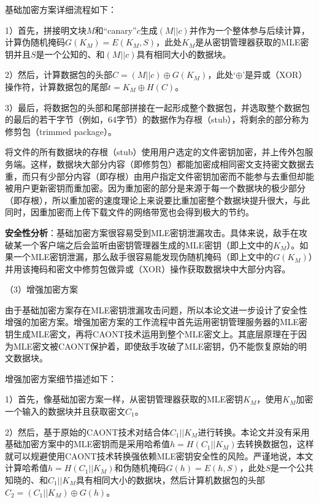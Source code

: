 \documentclass[promaster]{thesis-uestc}
\begin{document}
基础加密方案详细流程如下：

1）首先，拼接明文块$M$和“canary”$c$生成$(M||c)$并作为一个整体参与后续计算，计算伪随机掩码$G(K_M) = E(K_M, S)$，此处$K_M$是从密钥管理器获取的MLE密钥并且$S$是一个公知的、和$(M||c)$具有相同大小的数据块。

2）然后，计算数据包的头部$C = (M||c) \oplus G(K_M)$，此处‘$\oplus$’是异或（XOR）操作符，计算数据包的尾部$t = K_M \oplus H(C)$。

3）最后，将数据包的头部和尾部拼接在一起形成整个数据包，并选取整个数据包的最后的若干字节（例如，64字节）的数据作为存根（stub），将剩余的部分称为修剪包（trimmed package）。

将文件的所有数据块的存根（stub）使用用户选定的文件密钥加密，并上传外包服务端。这样，数据块大部分内容（即修剪包）都能加密成相同密文支持密文数据去重，而只有少部分内容（即存根）由用户指定文件密钥加密而不能参与去重但却能被用户更新密钥而重加密。因为重加密的部分是来源于每一个数据块的极少部分（即存根），所以重加密的速度理论上来说要比重加密整个数据块提升很大，与此同时，因重加密而上传下载文件的网络带宽也会得到极大的节约。

\textbf{安全性分析}：基础加密方案很容易受到MLE密钥泄漏攻击。具体来说，敌手在攻破某一个客户端之后会监听由密钥管理器生成的MLE密钥（即上文中的$K_M$）。如果一个MLE密钥泄漏，那么敌手很容易能发现伪随机掩码（即上文中的$G(K_M)$）并用该掩码和密文中修剪包做异或（XOR）操作获取数据块中大部分内容。

（3）增强加密方案\label{caont-enhanced}

由于基础加密方案存在MLE密钥泄漏攻击问题，所以本论文进一步设计了安全性增强的加密方案。增强加密方案的工作流程中首先运用密钥管理服务器的MLE密钥生成MLE密文，再将CAONT技术运用到整个MLE密文上。其底层原理在于因为MLE密文被CAONT保护着，即使敌手攻破了MLE密钥，仍不能恢复原始的明文数据块。

增强加密方案细节描述如下：

1）首先，像基础加密方案一样，从密钥管理器获取的MLE密钥$K_M$，使用$K_M$加密一个输入的数据块并且获取密文$C_1$。

2）然后，基于原始的CAONT技术对结合体$C_1||K_M$进行转换。本论文并没有采用基础加密方案中的MLE密钥而是采用哈希值$h =  H(C_1||K_M)$去转换数据包，这样就可以规避使用CAONT技术转换强依赖MLE密钥安全性的风险。严谨地说，本文计算哈希值$h = H(C_1||K_M)$和伪随机掩码$G(h) = E(h, S)$，此处$S$是一个公共知晓的、和$C_1||K_M$具有相同大小的数据块，然后计算机数据包的头部$C_2 = (C_1||K_M) \oplus G(h)$。
\end{document}
